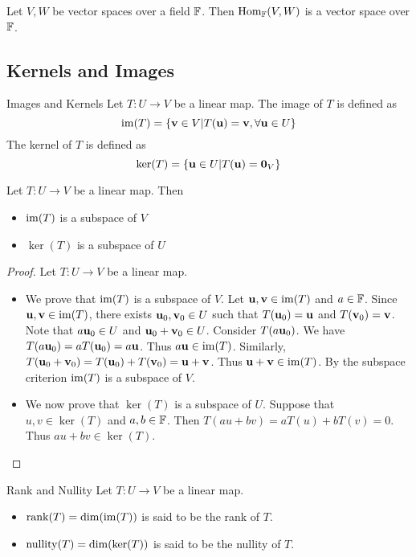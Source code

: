 \documentclass[a4paper]{article}
\begin{document}
\begin{lmm}{}{} Let $V,W$ be vector spaces over a field $\mathbb{F}$. Then $\operatorname{Hom}_{\mathbb{F}}(V,W)$ is a vector space over $\mathbb{F}$. 
\end{lmm}

\subsection{Kernels and Images}
\begin{defn}{Images and Kernels}{} Let $T:U\to V$ be a linear map. The image of $T$ is defined as $$\operatorname{im}(T)=\{\vb{v}\in V|T(\vb{u})=\vb{v}, \forall\vb{u}\in U\}$$ The kernel of $T$ is defined as $$\ker(T)=\{\vb{u}\in U|T(\vb{u})=\vb{0}_V\}$$
\end{defn}

\begin{thm}{}{} Let $T:U\to V$ be a linear map. Then
\begin{itemize}
\item $\operatorname{im}(T)$ is a subspace of $V$
\item $\ker(T)$ is a subspace of $U$
\end{itemize}\tcbline
\begin{proof} Let $T:U\to V$ be a linear map. 
\begin{itemize}
\item We prove that $\operatorname{im}(T)$ is a subspace of $V$. Let $\vb{u},\vb{v}\in\operatorname{im}(T)$ and $a\in\mathbb{F}$. Since $\vb{u},\vb{v}\in\operatorname{im}(T)$, there exists $\vb{u}_0,\vb{v}_0\in U$ such that $T(\vb{u}_0)=\vb{u}$ and $T(\vb{v}_0)=\vb{v}$. Note that $a\vb{u}_0\in U$ and $\vb{u}_0+\vb{v}_0\in U$. Consider $T(a\vb{u}_0)$. We have $T(a\vb{u}_0)=aT(\vb{u}_0)=a\vb{u}$. Thus $a\vb{u}\in\operatorname{im}(T)$. Similarly, $T(\vb{u}_0+\vb{v}_0)=T(\vb{u}_0)+T(\vb{v}_0)=\vb{u}+\vb{v}$. Thus $\vb{u}+\vb{v}\in\operatorname{im}(T)$. By the subspace criterion $\operatorname{im}(T)$ is a subspace of $V$. 
\item We now prove that $\ker(T)$ is a subspace of $U$. Suppose that $u,v\in\ker(T)$ and $a,b\in\mathbb{F}$. Then $T(au+bv)=aT(u)+bT(v)=0$. Thus $au+bv\in\ker(T)$. 
\end{itemize}
\end{proof}
\end{thm}

\begin{defn}{Rank and Nullity}{} Let $T:U\to V$ be a linear map. 
\begin{itemize}
\item $\rank(T)=\dim(\operatorname{im}(T))$ is said to be the rank of $T$. 
\item $\operatorname{nullity}(T)=\dim(\ker(T))$ is said to be the nullity of $T$. 
\end{itemize}
\end{defn}
\end{document}

